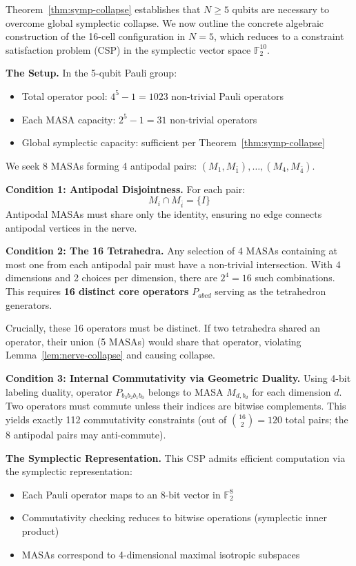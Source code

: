 \documentclass[11pt]{article}
\begin{document}
Theorem~\ref{thm:symp-collapse} establishes that $N \geq 5$ qubits are necessary to overcome global symplectic collapse. We now outline the concrete algebraic construction of the 16-cell configuration in $N=5$, which reduces to a constraint satisfaction problem (CSP) in the symplectic vector space $\mathbb{F}_2^{10}$.

\textbf{The Setup.} In the 5-qubit Pauli group:
\begin{itemize}
    \item Total operator pool: $4^5 - 1 = 1023$ non-trivial Pauli operators
    \item Each MASA capacity: $2^5 - 1 = 31$ non-trivial operators
    \item Global symplectic capacity: sufficient per Theorem~\ref{thm:symp-collapse}
\end{itemize}

We seek 8 MASAs forming 4 antipodal pairs: $(M_1, M_{\bar{1}}), \dots, (M_4, M_{\bar{4}})$.

\textbf{Condition 1: Antipodal Disjointness.} For each pair:
\[
    M_i \cap M_{\bar{i}} = \{I\}
\]
Antipodal MASAs must share only the identity, ensuring no edge connects antipodal vertices in the nerve.

\textbf{Condition 2: The 16 Tetrahedra.} Any selection of 4 MASAs containing at most one from each antipodal pair must have a non-trivial intersection. With 4 dimensions and 2 choices per dimension, there are $2^4 = 16$ such combinations. This requires \textbf{16 distinct core operators} $P_{abcd}$ serving as the tetrahedron generators.

Crucially, these 16 operators must be distinct. If two tetrahedra shared an operator, their union (5 MASAs) would share that operator, violating Lemma~\ref{lem:nerve-collapse} and causing collapse.

\textbf{Condition 3: Internal Commutativity via Geometric Duality.} Using 4-bit labeling duality, operator $P_{b_3 b_2 b_1 b_0}$ belongs to MASA $M_{d, b_d}$ for each dimension $d$. Two operators must commute unless their indices are bitwise complements. This yields exactly 112 commutativity constraints (out of $\binom{16}{2} = 120$ total pairs; the 8 antipodal pairs may anti-commute).

\textbf{The Symplectic Representation.} This CSP admits efficient computation via the symplectic representation:
\begin{itemize}
    \item Each Pauli operator maps to an 8-bit vector in $\mathbb{F}_2^8$
    \item Commutativity checking reduces to bitwise operations (symplectic inner product)
    \item MASAs correspond to 4-dimensional maximal isotropic subspaces
\end{itemize}
\end{document}
